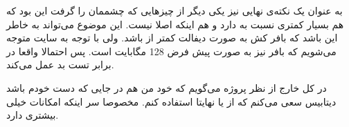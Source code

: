 به عنوان یک نکته‌ی نهایی نیز یکی دیگر از چیز‌هایی که چشممان را گرفت این بود که
 هم 
بسیار کمتری نسبت به
دارد و هم اینکه اصلا
نیست. این موضوع می‌تواند به خاطر این باشد که بافر کش
به صورت دیفالت کمتر از
باشد. ولی با توجه به
سایت متوجه می‌شویم که بافر
نیز به صورت پیش فرض 128 مگابایت است. پس احتمالا واقعا
در برابر تست
بد عمل می‌کند.

در کل خارج از نظر پروژه می‌گویم که خود من هم در جایی که دست خودم باشد دیتابیس سعی می‌کنم که از
 یا نهایتا 
استفاده کنم. مخصوصا سر اینکه
امکانات خیلی بیشتری دارد.